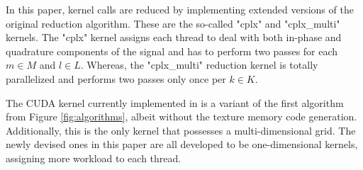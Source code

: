 \documentclass{juliacon}
\begin{document}
In this paper, kernel calls are reduced by implementing extended versions of the original reduction algorithm. These are the so-called "cplx" and "cplx\_multi" kernels. The "cplx" kernel assigns each thread to deal with both in-phase and quadrature components of the signal and has to perform two passes for each $m \in M$ and $l \in L$. Whereas, the "cplx\_multi" reduction kernel is totally parallelized and performs two passes only once per $k \in K$.

The CUDA kernel currently implemented in \cite{Schoenbrod2022} is a variant of the first algorithm from Figure \ref{fig:algorithms}, albeit without the texture memory code generation. Additionally, this is the only kernel that possesses a multi-dimensional grid. The newly devised ones in this paper are all developed to be one-dimensional kernels, assigning more workload to each thread.
\end{document}
